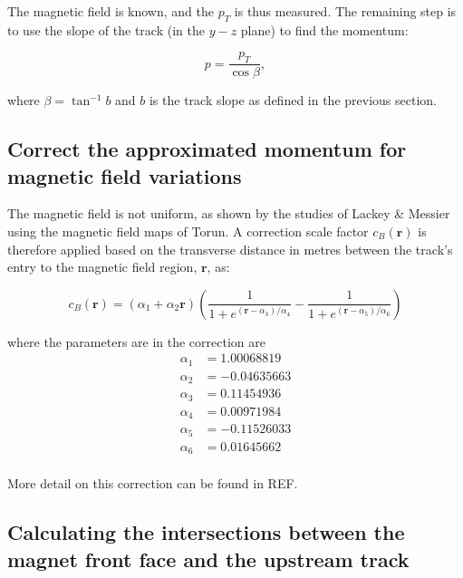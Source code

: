  The magnetic field is known, and the $p_T$ is thus measured. The remaining step is to use the slope of the track (in the $y-z$ plane) to find the momentum:
 
\begin{equation}
p = \frac{ p_T}{\cos{\beta}},
\end{equation}

where $\beta = \tan^{-1}{b}$ and $b$ is the track slope as defined in the previous section.
                                                                                                     

\subsection{Correct the approximated momentum for magnetic field variations}

The magnetic field is not uniform, as shown by the studies of Lackey \& Messier using the magnetic field maps of Torun. A correction scale factor $c_{B}(\textbf{r})$ is therefore applied based on the transverse distance in metres between the track's entry to the magnetic field region, $\textbf{r}$, as:

\begin{equation}
c_{B}(\textbf{r}) = ( \alpha_1 + \alpha_2 \textbf{r} ) \left(
 \frac{1}{ 1 + e^{  (\textbf{r}-\alpha_3)  / \alpha_4} }  - 
 \frac{1}{ 1 + e^{  (\textbf{r}-\alpha_5)  / \alpha_6  } } \right)
\end{equation}

where the parameters are in the correction are 
\begin{equation}
\begin{split}
\alpha_1 &=  1.00068819\\
\alpha_2 &= -0.04635663\\
\alpha_3 &=  0.11454936\\
\alpha_4 &=  0.00971984\\
\alpha_5 &= -0.11526033\\
\alpha_6 &=  0.01645662\\      
  \end{split}                                                                                                                                               
 \end{equation}
 
 More detail on this correction can be found in REF.
 
 \subsection{Calculating the intersections between the magnet front face and the upstream track}
 
